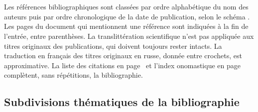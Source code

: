 \chapter[%
\bibname{}][%
\bibname{}]{%
\bibname{}}
\label{chap:Bibliographie}
\bibmark{}

Les références bibliographiques sont classées par ordre alphabétique du nom
des auteurs puis par ordre chronologique de la date de publication, selon le
schéma .
Les pages du document qui mentionnent une référence sont indiquées à la fin
de l'entrée, entre parenthèses.
La translittération scientifique n'est pas appliquée aux titres originaux
des publications, qui doivent toujours rester intacts.
La traduction en français des titres originaux en russe, donnée entre
crochets, est approximative.
La liste des citations en page~\pageref{chap:Listedescitations} et l'index
onomastique en page~\pageref{chap:Indexonomastique} complètent, sans
répétitions, la bibliographie.


\section{Subdivisions thématiques de la bibliographie}

